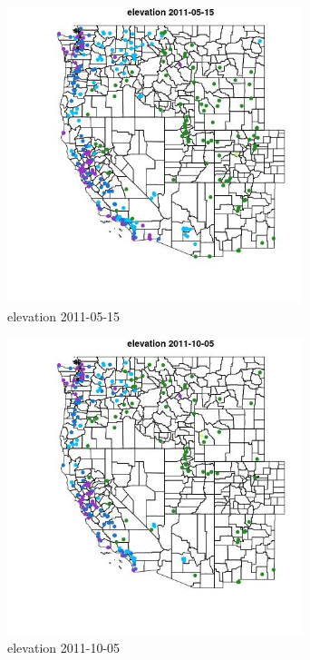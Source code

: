 \begin{figure} 
\centering  
\includegraphics[width=0.77\textwidth]{Code_Outputs/ML_input_report_ML_input_PM25_Step5_part_d_de_duplicated_aves_ML_input_MapObselevation2011-05-15.jpg} 
\caption{\label{fig:ML_input_report_ML_input_PM25_Step5_part_d_de_duplicated_aves_ML_inputMapObselevation2011-05-15}elevation 2011-05-15} 
\end{figure} 
 

\begin{figure} 
\centering  
\includegraphics[width=0.77\textwidth]{Code_Outputs/ML_input_report_ML_input_PM25_Step5_part_d_de_duplicated_aves_ML_input_MapObselevation2011-10-05.jpg} 
\caption{\label{fig:ML_input_report_ML_input_PM25_Step5_part_d_de_duplicated_aves_ML_inputMapObselevation2011-10-05}elevation 2011-10-05} 
\end{figure} 
 

